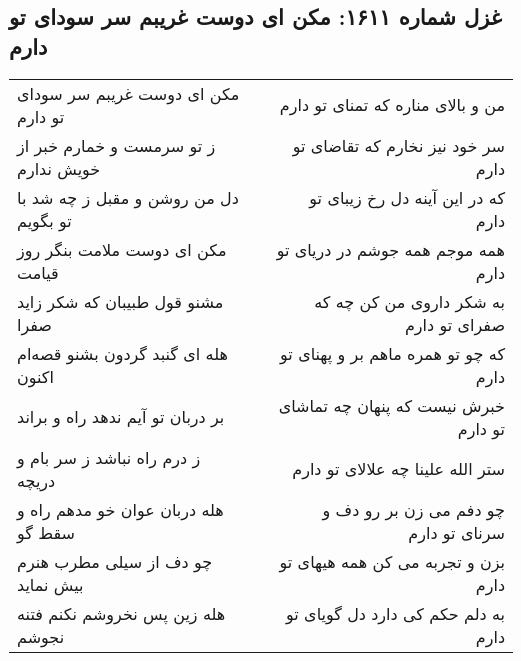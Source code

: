 \begin{center}
\section*{غزل شماره ۱۶۱۱: مکن ای دوست غریبم سر سودای تو دارم}
\label{sec:1611}
\begin{longtable}{l p{0.5cm} r}
مکن ای دوست غریبم سر سودای تو دارم
&&
من و بالای مناره که تمنای تو دارم
\\
ز تو سرمست و خمارم خبر از خویش ندارم
&&
سر خود نیز نخارم که تقاضای تو دارم
\\
دل من روشن و مقبل ز چه شد با تو بگویم
&&
که در این آینه دل رخ زیبای تو دارم
\\
مکن ای دوست ملامت بنگر روز قیامت
&&
همه موجم همه جوشم در دریای تو دارم
\\
مشنو قول طبیبان که شکر زاید صفرا
&&
به شکر داروی من کن چه که صفرای تو دارم
\\
هله ای گنبد گردون بشنو قصه‌ام اکنون
&&
که چو تو همره ماهم بر و پهنای تو دارم
\\
بر دربان تو آیم ندهد راه و براند
&&
خبرش نیست که پنهان چه تماشای تو دارم
\\
ز درم راه نباشد ز سر بام و دریچه
&&
ستر الله علینا چه علالای تو دارم
\\
هله دربان عوان خو مدهم راه و سقط گو
&&
چو دفم می زن بر رو دف و سرنای تو دارم
\\
چو دف از سیلی مطرب هنرم بیش نماید
&&
بزن و تجربه می کن همه هیهای تو دارم
\\
هله زین پس نخروشم نکنم فتنه نجوشم
&&
به دلم حکم کی دارد دل گویای تو دارم
\\
\end{longtable}
\end{center}
